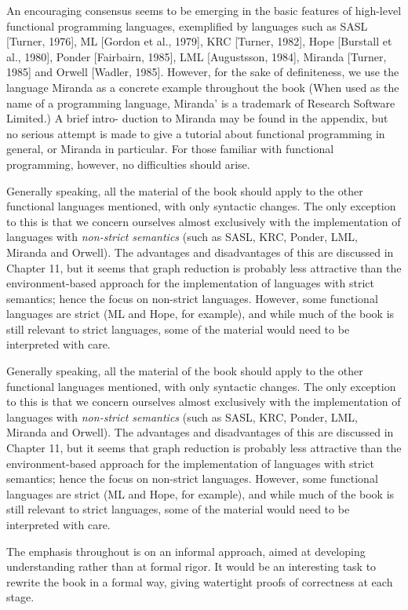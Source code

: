 An encouraging consensus seems to be emerging in the basic features of
high-level functional programming languages, exemplified by languages such
as SASL [Turner, 1976], ML [Gordon et al., 1979], KRC [Turner, 1982],
Hope [Burstall et al., 1980], Ponder [Fairbairn, 1985], LML [Augustsson,
1984], Miranda [Turner, 1985] and Orwell [Wadler, 1985]. However, for the
sake of definiteness, we use the language Miranda as a concrete example
throughout the book (When used as the name of a programming language,
Miranda' is a trademark of Research Software Limited.) A brief intro-
duction to Miranda may be found in the appendix, but no serious attempt is
made to give a tutorial about functional programming in general, or Miranda
in particular. For those familiar with functional programming, however, no
difficulties should arise.

Generally speaking, all the material of the book should apply to the other
functional languages mentioned, with only syntactic changes. The only
exception to this is that we concern ourselves almost exclusively with the
implementation of languages with \textit{non-strict semantics} (such as SASL, KRC,
Ponder, LML, Miranda and Orwell). The advantages and disadvantages of
this are discussed in Chapter 11, but it seems that graph reduction is probably
less attractive than the environment-based approach for the implementation
of languages with strict semantics; hence the focus on non-strict languages.
However, some functional languages are strict (ML and Hope, for example),
and while much of the book is still relevant to strict languages, some of the
material would need to be interpreted with care.

Generally speaking, all the material of the book should apply to the other
functional languages mentioned, with only syntactic changes. The only
exception to this is that we concern ourselves almost exclusively with the
implementation of languages with \textit{non-strict semantics} (such as SASL, KRC,
Ponder, LML, Miranda and Orwell). The advantages and disadvantages of
this are discussed in Chapter 11, but it seems that graph reduction is probably
less attractive than the environment-based approach for the implementation
of languages with strict semantics; hence the focus on non-strict languages.
However, some functional languages are strict (ML and Hope, for example),
and while much of the book is still relevant to strict languages, some of the
material would need to be interpreted with care.

The emphasis throughout is on an informal approach, aimed at developing
understanding rather than at formal rigor. It would be an interesting task to
rewrite the book in a formal way, giving watertight proofs of correctness at
each stage.

